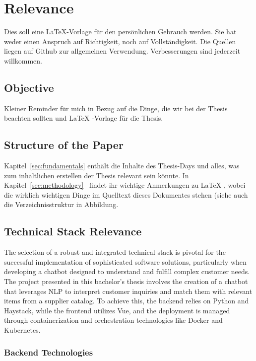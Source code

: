 \section{Relevance}\label{sec:Relevance}
Dies soll eine \LaTeX{}-Vorlage für den persönlichen Gebrauch werden. Sie hat weder einen Anspruch auf Richtigkeit, noch
auf Vollständigkeit. Die Quellen liegen auf Github zur allgemeinen Verwendung. Verbesserungen sind jederzeit willkommen.

\subsection{Objective}\label{subsec:objective}
Kleiner Reminder für mich in Bezug auf die Dinge, die wir bei der Thesis beachten sollten und \LaTeX{}
-Vorlage für die Thesis.

\subsection{Structure of the Paper}\label{subsec:structure-of-the-paper}
Kapitel~\ref{sec:fundamentals}
enthält die Inhalte des Thesis-Days und alles, was zum inhaltlichen erstellen der Thesis relevant sein könnte.
In
Kapitel~\ref{sec:methodology}~ findet ihr wichtige Anmerkungen zu \LaTeX{}
, wobei die wirklich wichtigen Dinge im Quelltext dieses Dokumentes stehen (siehe auch die Verzeichnisstruktur in
Abbildung.

\subsection{Technical Stack Relevance}\label{subsec:technical-stack-relevance}

The selection of a robust and integrated technical stack is pivotal for the successful implementation of sophisticated
software solutions, particularly when developing a chatbot designed to understand and fulfill complex customer needs.
The project presented in this bachelor’s thesis involves the creation of a chatbot that leverages \ac{NLP} to interpret
customer inquiries and match them with relevant items from a supplier catalog. To achieve this, the backend relies on
Python and Haystack, while the frontend utilizes Vue, and the deployment is managed through containerization and
orchestration technologies like Docker and Kubernetes.

\subsubsection{Backend Technologies}

